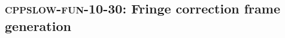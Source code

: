 \subsection{\textsc{cppslow-fun-10-30}: Fringe correction frame generation}
\label{cppslow-fun-10-30}

